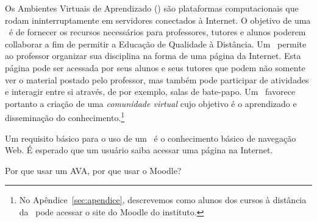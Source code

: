 Os Ambientes Virtuais de Aprendizado (\avas) s{\~ a}o plataformas computacionais que rodam ininterruptamente em servidores 
conectados {\`a} Internet. O objetivo de uma \ava\ {\'e} de fornecer os recursos necess{\' a}rios para professores, tutores 
e alunos poderem collaborar a fim de permitir a Educa{\c c}{\~ a}o de Qualidade {\`a} Dist{\^ a}ncia. Um \ava\ permite ao 
professor organizar sua disciplina na forma
de uma p{\' a}gina da Internet. Esta p{\' a}gina pode ser acessada por seus alunos e seus tutores que podem n{\~ a}o somente ver o 
material postado pelo professor, mas tamb{\'e}m pode participar de atividades e interagir entre si atrav{\'e}s, de 
por exemplo, salas de bate-papo. Um \ava\ favorece portanto a cria{\c c}{\~ a}o de uma \emph{comunidade virtual} cujo objetivo 
{\'e} o aprendizado e dissemina{\c c}{\~ a}o do conhecimento.\footnote{No Apêndice~\ref{sec:apendice}, 
descrevemos como alunos dos cursos {\`a} dist{\^ a}ncia da \ufpb\ pode acessar o site do Moodle do instituto.}

Um requisito b{\' a}sico para o uso de um \ava\ {\'e} o conhecimento b{\' a}sico de navega{\c c}{\~ a}o Web. É esperado que um usu{\' a}rio 
saiba acessar uma p{\' a}gina na Internet. 

Por que usar um AVA, por que usar o Moodle?

